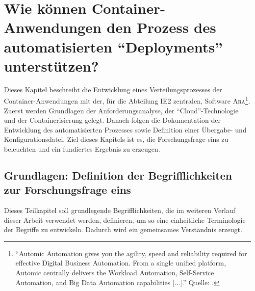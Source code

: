 \chapter[Forschungsfrage 1]{Wie können Container-Anwendungen den Prozess des automatisierten \enquote{Deployments} unterstützen?} \label{ff1}
Dieses Kapitel beschreibt die Entwicklung eines Verteilungsprozesses der Container-Anwendungen mit der, für die Abteilung \ac{IE2} zentralen, Software \textsc{Ara}\footnote{\enquote{Automic Automation gives you the agility, speed and reliability required for effective Digital Business Automation. From a single unified platform, Automic centrally delivers the Workload Automation, Self-Service Automation, and Big Data Automation capabilities [...].} Quelle: \cite{broadcom_inc_automic_2020}.}. Zuerst werden Grundlagen der Anforderungsanalyse, der \enquote{Cloud}-Technologie und der Containerisierung gelegt. Danach folgen die Dokumentation der Entwicklung des automatisierten Prozesses sowie Definition einer Übergabe- und Konfigurationsdatei. Ziel dieses Kapitels ist es, die Forschungsfrage eins zu beleuchten und ein fundiertes Ergebnis zu erzeugen.

\section{Grundlagen: Definition der Begrifflichkeiten zur Forschungsfrage eins}
Dieses Teilkapitel soll grundlegende Begrifflichkeiten, die im weiteren Verlauf dieser Arbeit verwendet werden, definieren, um so eine einheitliche Terminologie der Begriffe zu entwickeln. Dadurch wird ein gemeinsames Verständnis erzeugt.

